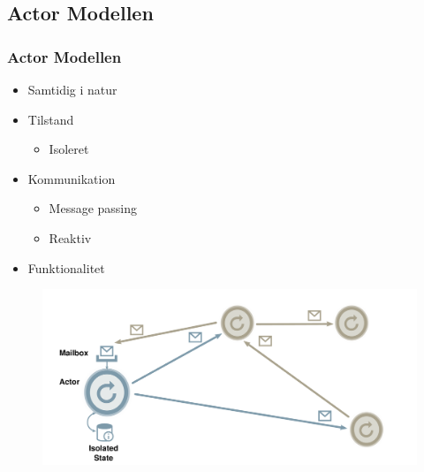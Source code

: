 \subsection{Actor Modellen}
\begin{frame}
  \frametitle{Actor Modellen}
  \begin{itemize}
    \item Samtidig i natur
    \item Tilstand
    \begin{itemize}
      \item Isoleret
    \end{itemize}
    \item Kommunikation
    \begin{itemize}
      \item Message passing
      \item Reaktiv
    \end{itemize}
    \item Funktionalitet
  \end{itemize}
  \begin{figure}[htbp]
  \centering
  \includegraphics[width=\textwidth]{Images/actors.pdf}
  \end{figure}
\end{frame}

